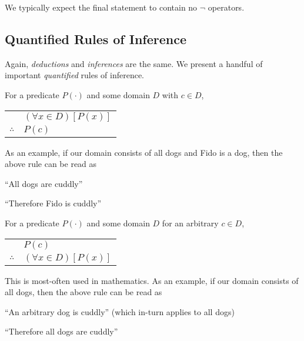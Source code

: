 \documentclass[main.tex]{subfiles}
\begin{document}
\begin{rem}
	We typically expect the final statement to contain no \(\lnot\) operators.
\end{rem}

\subsection{Quantified Rules of Inference}

Again, \textit{deductions} and \textit{inferences} are the same. We present a handful of important \textit{quantified} rules of inference.

\begin{thm}
	For a predicate \(P(\cdot)\) and some domain \(D\) with \(c \in D\),
	\begin{center}
		\begin{tabular}{c@{\,}l@{}}
			& \((\forall x \in D)[P(x)]\) \\
			\cline{2-2}
			\(\therefore\) & \(P(c)\)
		\end{tabular}
	\end{center}

	As an example, if our domain consists of all dogs and Fido is a dog, then the above rule can be read as
	\begin{center}
		``All dogs are cuddly''
		
		``Therefore Fido is cuddly''
	\end{center}
\end{thm}

\begin{thm}
	For a predicate \(P(\cdot)\) and some domain \(D\) for an arbitrary \(c \in D\),
	\begin{center}
		\begin{tabular}{c@{\,}l@{}}
			& \(P(c)\) \\
			\cline{2-2}
			\(\therefore\) & \((\forall x \in D)[P(x)]\)
		\end{tabular}
	\end{center}

	This is most-often used in mathematics. As an example, if our domain consists of all dogs, then the above rule can be read as
	\begin{center}
		``An arbitrary dog is cuddly'' (which in-turn applies to all dogs)
		
		``Therefore all dogs are cuddly''
	\end{center}
\end{thm}
\end{document}
